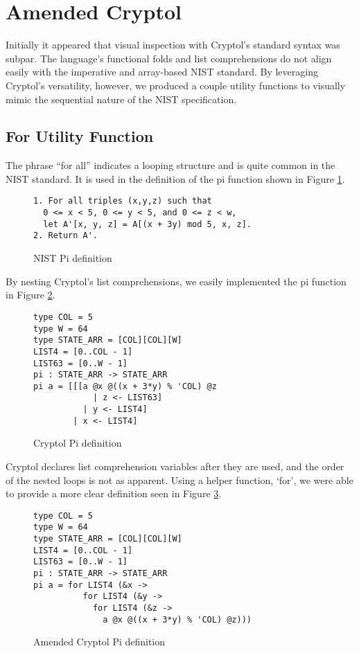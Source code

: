\section{Amended Cryptol}
\label{sec:amended}
Initially it appeared that visual inspection with Cryptol’s standard syntax was subpar.
The language's functional folds and list comprehensions do not align easily with the imperative 
and array-based NIST standard. By leveraging Cryptol’s versatility, however, we produced a couple 
utility functions to visually mimic the sequential nature of the NIST specification. 

\subsection{For Utility Function}
The phrase “for all” indicates a looping structure and is quite common in the NIST standard. 
It is used in the definition of the pi function shown in Figure \ref{fig:nistPi}.

\begin{figure}[h]
  \centering
  \begin{lstlisting}[basewidth = {.5em}]
1. For all triples (x,y,z) such that 
  0 <= x < 5, 0 <= y < 5, and 0 <= z < w,
  let A'[x, y, z] = A[(x + 3y) mod 5, x, z].
2. Return A'.
  \end{lstlisting}
  \caption{NIST Pi definition}
  \label{fig:nistPi}
\end{figure}
    
By nesting Cryptol's list comprehensions, we easily implemented the pi function in Figure 
\ref{fig:cryptolPi}. 

\begin{figure}[h]
  \centering
\begin{lstlisting}[language=Cryptol]
type COL = 5 
type W = 64
type STATE_ARR = [COL][COL][W]
LIST4 = [0..COL - 1]
LIST63 = [0..W - 1]
pi : STATE_ARR -> STATE_ARR
pi a = [[[a @x @((x + 3*y) % 'COL) @z 
            | z <- LIST63] 
          | y <- LIST4] 
        | x <- LIST4]
\end{lstlisting}
\caption{Cryptol Pi definition}
\label{fig:cryptolPi}
\end{figure}

Cryptol declares list comprehension variables after they are used, and the order of the
nested loops is not as apparent. Using a helper function, ‘for’, we were able to provide
a more clear definition seen in Figure \ref{fig:cryptolAmendedPi}.

\begin{figure}[h]
  \centering
\begin{lstlisting}[language=Cryptol]
type COL = 5 
type W = 64
type STATE_ARR = [COL][COL][W]
LIST4 = [0..COL - 1]
LIST63 = [0..W - 1]
pi : STATE_ARR -> STATE_ARR
pi a = for LIST4 (&x ->
          for LIST4 (&y -> 
            for LIST4 (&z -> 
              a @x @((x + 3*y) % 'COL) @z)))
\end{lstlisting}
\caption{Amended Cryptol Pi definition}
\label{fig:cryptolAmendedPi}
\end{figure}

